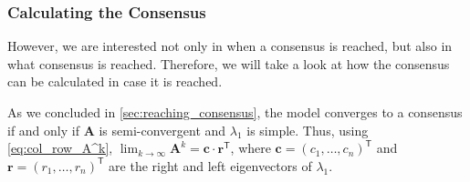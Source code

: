 \documentclass[journal,compsoc,10pt]{IEEEtran}
\newcommand{\T}{\mathsf{T}}            %
\renewcommand{\vec}[1]{\bm{#1}}        %
\newcommand{\mat}[1]{\bm{#1}}          %
\newtheorem{theorem}{Theorem}[section]
\begin{document}



\subsubsection{Calculating the Consensus}\label{sec:calculating_conv}
However, we are interested not only in when a consensus is reached, but also in what consensus is reached. Therefore, we will take a look at how the consensus can be calculated in case it is reached.

As we concluded in \cref{sec:reaching_consensus}, the model converges to a consensus if and only if $\mat A$ is semi-convergent and $\lambda_1$ is simple. Thus, using \cref{eq:col_row_A^k}, $\lim_{k\rightarrow\infty}\mat A^k = \vec c \cdot\vec r^\T$, where $\vec c = (c_1, \dots, c_n)^\T$ and $\vec r = (r_1, \dots, r_n)^\T$ are the right and left eigenvectors of $\lambda_1$.
 
\end{document}
